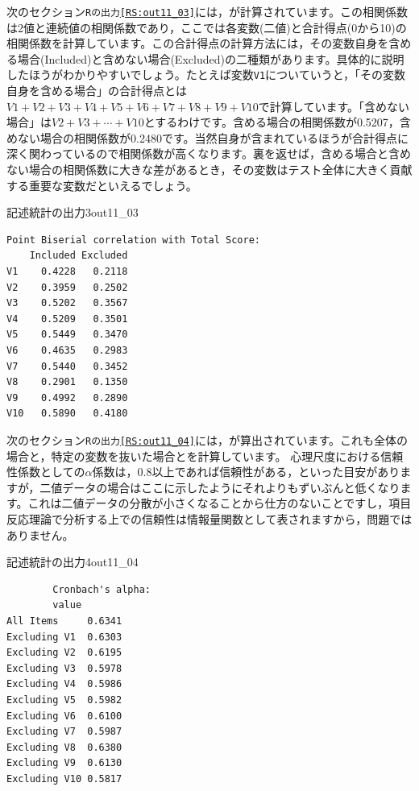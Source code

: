 \documentclass{ltjsbook}
\begin{document}
次のセクション\texttt{Rの出力\ref{RS:out11_03}}には，が計算されています。この相関係数は2値と連続値の相関係数であり，ここでは各変数(二値)と合計得点(0から10)の相関係数を計算しています。この合計得点の計算方法には，その変数自身を含める場合(Included)と含めない場合(Excluded)の二種類があります。具体的に説明したほうがわかりやすいでしょう。たとえば変数\texttt{V1}についていうと，「その変数自身を含める場合」の合計得点とは$V1+V2+V3+V4+V5+V6+V7+V8+V9+V10$で計算しています。「含めない場合」は$V2+V3+\cdots+V10$とするわけです。含める場合の相関係数が0.5207，含めない場合の相関係数が0.2480です。当然自身が含まれているほうが合計得点に深く関わっているので相関係数が高くなります。裏を返せば，含める場合と含めない場合の相関係数に大きな差があるとき，その変数はテスト全体に大きく貢献する重要な変数だといえるでしょう。
\begin{Rscreen}{記述統計の出力3}{out11_03}
	\begin{verbatim}
Point Biserial correlation with Total Score:
    Included Excluded
V1    0.4228   0.2118
V2    0.3959   0.2502
V3    0.5202   0.3567
V4    0.5209   0.3501
V5    0.5449   0.3470
V6    0.4635   0.2983
V7    0.5440   0.3452
V8    0.2901   0.1350
V9    0.4992   0.2890
V10   0.5890   0.4180
    \end{verbatim}
\end{Rscreen}

次のセクション\texttt{Rの出力\ref{RS:out11_04}}には，が算出されています。これも全体の場合と，特定の変数を抜いた場合とを計算しています。
心理尺度における信頼性係数としての$\alpha$係数は，0.8以上であれば信頼性がある，といった目安がありますが，二値データの場合はここに示したようにそれよりもずいぶんと低くなります。これは二値データの分散が小さくなることから仕方のないことですし，項目反応理論で分析する上での信頼性は情報量関数として表されますから，問題ではありません。
\begin{Rscreen}{記述統計の出力4}{out11_04}
	\begin{verbatim}
        Cronbach's alpha:
        value
All Items     0.6341
Excluding V1  0.6303
Excluding V2  0.6195
Excluding V3  0.5978
Excluding V4  0.5986
Excluding V5  0.5982
Excluding V6  0.6100
Excluding V7  0.5987
Excluding V8  0.6380
Excluding V9  0.6130
Excluding V10 0.5817
    \end{verbatim}
\end{Rscreen}
\end{document}
